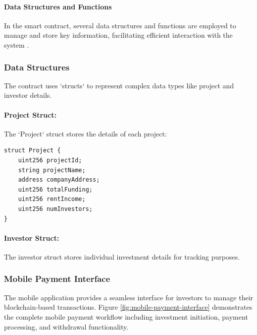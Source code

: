\paragraph{Data Structures and Functions}

In the smart contract, several data structures and functions are employed to manage and store key information, facilitating efficient interaction with the system \cite{Dannen2017SoliditySmartContracts}.

\subsubsection{Data Structures}

The contract uses `structs` to represent complex data types like project and investor details.

\paragraph{Project Struct:}
The `Project` struct stores the details of each project:
\begin{verbatim}
struct Project {
    uint256 projectId;
    string projectName;
    address companyAddress;
    uint256 totalFunding;
    uint256 rentIncome;
    uint256 numInvestors;
}
\end{verbatim}

\paragraph{Investor Struct:}
The investor struct stores individual investment details for tracking purposes.
\newpage
\subsubsection*{Mobile Payment Interface}

The mobile application provides a seamless interface for investors to manage their blockchain-based transactions. Figure \ref{fig:mobile-payment-interface} demonstrates the complete mobile payment workflow including investment initiation, payment processing, and withdrawal functionality.

